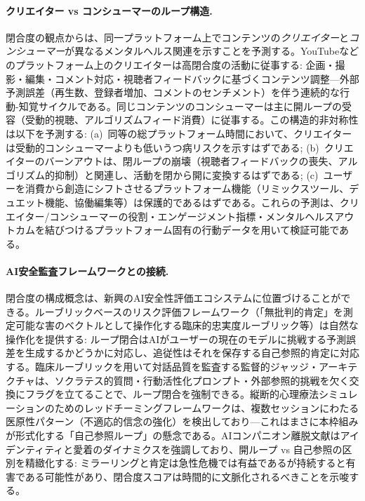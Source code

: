 \documentclass[a4paper,11pt,titlepage]{article}
\begin{document}
\paragraph{クリエイター vs コンシューマーのループ構造.}
閉合度の観点からは、同一プラットフォーム上でコンテンツの\textit{クリエイター}と\textit{コンシューマー}が異なるメンタルヘルス関連を示すことを予測する。YouTubeなどのプラットフォーム上のクリエイターは高閉合度の活動に従事する: 企画・撮影・編集・コメント対応・視聴者フィードバックに基づくコンテンツ調整---外部予測誤差（再生数、登録者増加、コメントのセンチメント）を伴う連続的な行動-知覚サイクルである。同じコンテンツのコンシューマーは主に開ループの受容（受動的視聴、アルゴリズムフィード消費）に従事する。この構造的非対称性は以下を予測する: (a)~同等の総プラットフォーム時間において、クリエイターは受動的コンシューマーよりも低いうつ病リスクを示すはずである; (b)~クリエイターのバーンアウトは、閉ループの崩壊（視聴者フィードバックの喪失、アルゴリズム的抑制）と関連し、活動を閉から開に変換するはずである; (c)~ユーザーを消費から創造にシフトさせるプラットフォーム機能（リミックスツール、デュエット機能、協働編集等）は保護的であるはずである。これらの予測は、クリエイター/コンシューマーの役割・エンゲージメント指標・メンタルヘルスアウトカムを結びつけるプラットフォーム固有の行動データを用いて検証可能である。

\paragraph{AI安全監査フレームワークとの接続.}
閉合度の構成概念は、新興のAI安全性評価エコシステムに位置づけることができる。ルーブリックベースのリスク評価フレームワーク（「無批判的肯定」を測定可能な害のベクトルとして操作化する臨床的忠実度ルーブリック等）は自然な操作化を提供する: ループ閉合はAIがユーザーの現在のモデルに挑戦する予測誤差を生成するかどうかに対応し、追従性はそれを保存する自己参照的肯定に対応する。臨床ルーブリックを用いて対話品質を監査する監督的ジャッジ・アーキテクチャは、ソクラテス的質問・行動活性化プロンプト・外部参照的挑戦を欠く交換にフラグを立てることで、ループ閉合を強制できる。縦断的心理療法シミュレーションのためのレッドチーミングフレームワークは、複数セッションにわたる医原性パターン（不適応的信念の強化）を検出しており---これはまさに本枠組みが形式化する「自己参照ループ」の懸念である。AIコンパニオン離脱文献はアイデンティティと愛着のダイナミクスを強調しており、開ループ vs 自己参照の区別を精緻化する: ミラーリングと肯定は急性危機では有益であるが持続すると有害である可能性があり、閉合度スコアは時間的に文脈化されるべきことを示唆する。
\end{document}
